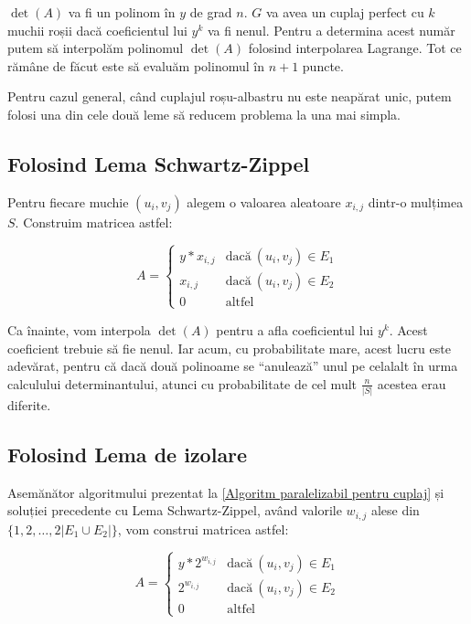 $\det(A)$ va fi un polinom în $y$ de grad $n$. $G$ va avea un cuplaj perfect cu
$k$ muchii roșii dacă coeficientul lui $y^{k}$ va fi nenul. Pentru a determina
acest număr putem să interpolăm polinomul $\det(A)$ folosind interpolarea
Lagrange. Tot ce rămâne de făcut este să evaluăm polinomul în $n+1$ puncte. \par

Pentru cazul general, când cuplajul roșu-albastru nu este neapărat unic, putem
folosi una din cele două leme să reducem problema la una mai simpla.

\subsection{Folosind Lema Schwartz-Zippel}

Pentru fiecare muchie $(u_{i}, v_{j})$ alegem o valoarea aleatoare $x_{i,j}$ dintr-o
mulțimea $S$. Construim matricea astfel:

\begin{equation}
  A=
  \begin{cases}
    y * x_{i,j} & \text{dacă}\ (u_{i}, v_{j}) \in E_{1} \\
    x_{i,j} & \text{dacă}\ (u_{i}, v_{j}) \in E_{2} \\
    0 & \text{altfel}
  \end{cases}
\end{equation}

Ca înainte, vom interpola $\det(A)$ pentru a afla coeficientul lui $y^{k}$.
Acest coeficient trebuie să fie nenul. Iar acum, cu probabilitate mare, acest
lucru este adevărat, pentru că dacă două polinoame se ``anulează'' unul pe
celalalt în urma calculului determinantului, atunci cu probabilitate de cel mult
$\frac{n}{|S|}$ acestea erau diferite.

\subsection{Folosind Lema de izolare}
Asemănător algoritmului prezentat la \ref{Algoritm paralelizabil pentru cuplaj}
și soluției precedente cu Lema Schwartz-Zippel, având valorile $w_{i,j}$ alese
din $\{1, 2, \ldots, 2|E_{1} \cup E_{2}|\}$, vom construi matricea astfel:

\begin{equation}
  A=
  \begin{cases}
    y * 2^{w_{i,j}} & \text{dacă}\ (u_{i}, v_{j}) \in E_{1} \\
    2^{w_{i,j}} & \text{dacă}\ (u_{i}, v_{j}) \in E_{2} \\
    0 & \text{altfel}
  \end{cases}
\end{equation}

